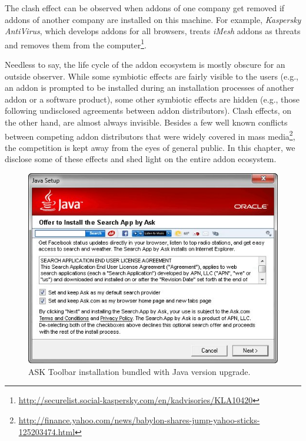 \documentclass[11pt,oneside]{book}
\begin{document}
The clash effect can be observed when addons of one company get removed if addons of another company are installed on this machine. For example, \emph{Kaspersky AntiVirus}, which develops addons for all browsers, treats \emph{iMesh} addons as threats and removes them from the computer\footnote{\url{http://securelist.social-kaspersky.com/en/kadvisories/KLA10420}}.

Needless to say, the life cycle of the addon ecosystem is mostly obscure for an outside observer. While some symbiotic effects are fairly visible to the users (e.g., an addon is prompted to be installed during an installation processes of another addon or a software product), some other symbiotic effects are hidden (e.g., those following undisclosed agreements between addon distributors). Clash effects, on the other hand, are almost always invisible. Besides a few well known conflicts between competing addon distributors that were widely covered in mass media\footnote{\url{http://finance.yahoo.com/news/babylon-shares-jump-yahoo-sticks-125203474.html}}, the competition is kept away from the eyes of general public. In this chapter, we disclose some of these effects and shed light on the entire addon ecosystem. 

\begin{figure}[!htbp]
\centering
\includegraphics[scale=.8,angle=0]{figures/ask_offer.png}
\caption{ASK Toolbar installation bundled with Java version upgrade.}
\label{fig:ask_offer}
\end{figure} 
\end{document}
